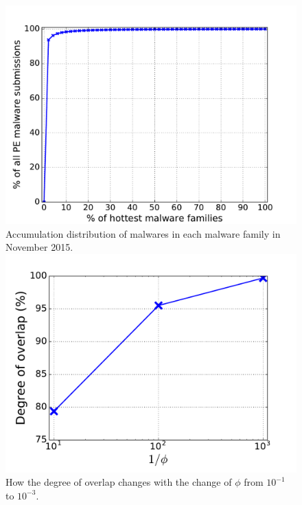 
\begin{figure}[!htb]
  \includegraphics[width=\linewidth]{figure/cum}
{
Accumulation distribution of malwares in each malware family in November 2015.
}
\endminipage\hfill
{}
  \includegraphics[width=\linewidth]{figure/overlap.pdf}
  {
  How the degree of overlap changes with the change of $\phi$ from $10^{-1}$ to $10^{-3}$.
  }
\endminipage\hfill
{}

\end{figure}

